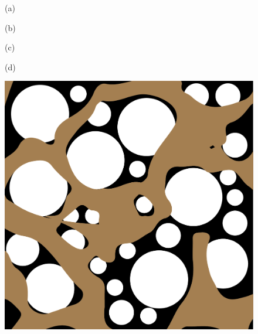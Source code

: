 \documentclass[a4paper,num-refs]{oup-contemporary}
\begin{document}
\begin{figure} 
\begin{center}
		\begin{minipage}[t]{0.24\linewidth}
\centerline{(a)}

	\end{minipage}
	\begin{minipage}[t]{0.24\linewidth}

\centerline{(b)}
	\end{minipage}
	\begin{minipage}[t]{0.24\linewidth}
\centerline{(c)}
	\end{minipage}
	\begin{minipage}[t]{0.24\linewidth}
\centerline{(d)}
	\end{minipage}
\hfill
	\begin{minipage}[c]{0.24\linewidth}
		\centering
	\def\svgwidth{\linewidth}

						\newline
	\end{minipage}
	\begin{minipage}[c]{0.24\linewidth}
		\centering
	\def\svgwidth{\linewidth}

	\newline
	\end{minipage}
	\begin{minipage}[c]{0.24\linewidth}
		\centering
			\includegraphics[width=\linewidth]{real_mesh_n1.png}

\end{minipage}
\end{center}
\end{figure}
\end{document}
